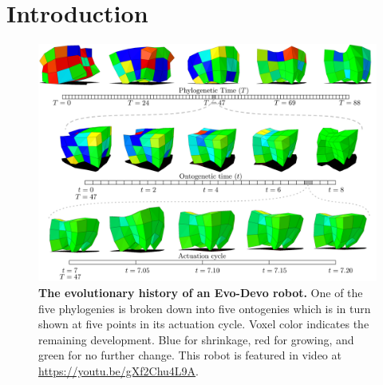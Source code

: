 \section{Introduction}
\label{sec:introduction}

\begin{figure}[t]
\includegraphics[width=1\textwidth]{Chapter03/img/softbot6000}
\caption{\label{fig:videos}   \textbf{The evolutionary history of an Evo-Devo robot.} One of the five phylogenies is broken down into five ontogenies which is in turn shown at five points in its actuation cycle. Voxel color indicates the remaining development. Blue for shrinkage, red for growing, and green for no further change. This robot is featured in video at \href{https://youtu.be/gXf2Chu4L9A}{https://youtu.be/gXf2Chu4L9A}.}
\end{figure}






